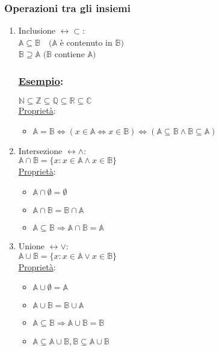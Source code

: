 \documentclass{article}
\newcommand{\ul}[1]{\underline{#1}}
\newcommand{\R}{\mathbb{R}}
\newcommand{\Esempio}[1]{\subsubsection*{\ul{Esempio}:}#1}
\begin{document}
\subsubsection*{Operazioni tra gli insiemi}
\begin{enumerate}
	\item Inclusione $\leftrightarrow\subset$:\\
	      $\mathbb{A}\subseteq\mathbb{B}\quad(\mathbb{A}$ è contenuto in $\mathbb{B})$\\
	      $\mathbb{B}\supseteq\mathbb{A}$ $(\mathbb{B}$ contiene $\mathbb{A})$
	      \Esempio{$\mathbb{N}\subseteq\mathbb{Z}\subseteq\mathbb{Q}\subseteq\R\subseteq\mathbb{C}$}\\
	      \ul{Proprietà}:
	      \begin{itemize}
		      \item $\mathbb{A}=\mathbb{B}\Leftrightarrow(x\in\mathbb{A}\Leftrightarrow x\in\mathbb{B})\Leftrightarrow(\mathbb{A}\subseteq\mathbb{B}\wedge\mathbb{B}\subseteq\mathbb{A})$
	      \end{itemize}
	\item Intersezione $\leftrightarrow\wedge$:\\
	      $\mathbb{A}\cap\mathbb{B}=\{x:x\in\mathbb{A}\wedge x\in\mathbb{B}\}$\\
	      \ul{Proprietà}:
	      \begin{itemize}
		      \item $\mathbb{A}\cap\emptyset=\emptyset$
		      \item $\mathbb{A}\cap\mathbb{B}=\mathbb{B}\cap\mathbb{A}$
		      \item $\mathbb{A}\subseteq\mathbb{B}\Rightarrow\mathbb{A}\cap\mathbb{B}=\mathbb{A}$
	      \end{itemize}
	\item Unione $\leftrightarrow\vee$:\\
	      $\mathbb{A}\cup\mathbb{B}=\{x:x\in\mathbb{A}\vee x\in\mathbb{B}\}$\\
	      \ul{Proprietà}:
	      \begin{itemize}
		      \item $\mathbb{A}\cup\emptyset=\mathbb{A}$
		      \item $\mathbb{A}\cup\mathbb{B}=\mathbb{B}\cup\mathbb{A}$
		      \item $\mathbb{A}\subseteq\mathbb{B}\Rightarrow\mathbb{A}\cup\mathbb{B}=\mathbb{B}$
		      \item $\mathbb{A}\subseteq\mathbb{A}\cup\mathbb{B},\mathbb{B}\subseteq\mathbb{A}\cup\mathbb{B}$

\end{itemize}
\end{enumerate}
\end{document}
